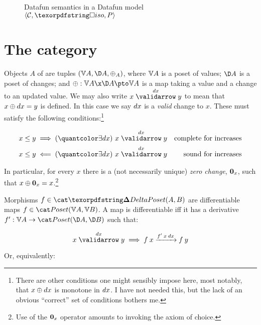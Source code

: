 \documentclass{rntz}\usepackage{fantasy}%
\begin{document}
\begin{figure*}


  \caption{Datafun semantics in a Datafun model $\tuple{\catC, \disco, \pfin}$}
  \label{fig:semantics}\label{def:strip}
\end{figure*}


\section{The category \CP}
\label{sec:changeposets}

Objects $A$ of \CP{} are tuples $(\vals A, \chgs A, \updfn_A)$, where
%
$\mathbb{V} A$ is a poset of values;
%
$\chgs A$ is a poset of changes;
%
and $\updfn : \vals A \x \chgs A \pto \vals A$ is a  map taking
a value and a change to an updated value.
%
We may also write $\vld{\dx} x y$ to mean that $x \mathbin{\oplus} {dx} = y$ is defined. In
this case we say ${dx}$ is a \emph{valid} change to $x$.
%
These must satisfy the following conditions:\footnote{There are other conditions
  one might sensibly impose here, most notably, that $x \mathbin{\oplus} {dx}$ is monotone in
  ${dx}$. I have not needed this, but the lack of an obvious ``correct'' set of
  conditions bothers me.}

\nopagebreak[2]
\begin{align*}
  x \le y &\implies \ex{\dx} \vld{\dx} x y
  & \text{complete for increases}\\
  x \le y &\impliedby \ex{\dx} \vld{\dx} x y
  & \text{sound for increases}
\end{align*}

\noindent In particular, for every $x$ there is a (not necessarily unique)
\emph{zero change}, $\boldsymbol{0}_x$, such that $x \mathbin{\oplus} \boldsymbol{0}_x = x$.\footnote{Use of
  the $\boldsymbol{0}_x$ operator amounts to invoking the axiom of choice.}

Morphisms $f \in \CP(A,B)$ are differentiable maps $f \in \Poset(\vals A, \vals
B)$. A map is differentiable iff it has a derivative $\deriv f : \vals A \to
\Poset(\chgs A, \chgs B)$ such that:

\nopagebreak[2]
\[ \vld{\dx} x y \implies \longvld{\deriv f\<x\<\dx}{f\<x}{f\<y}\]

\noindent Or, equivalently:
\end{document}
